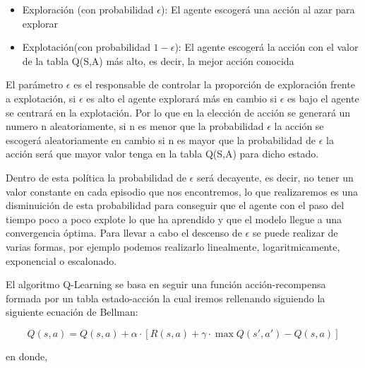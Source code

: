 \begin{itemize}
 \begin{itemize}
   \item Exploración (con probabilidad $\epsilon$): El agente escogerá una acción al azar para explorar
   \item Explotación(con probabilidad $ 1 - \epsilon$): El agente escogerá la acción con el valor de la tabla Q(S,A) más alto, es decir, la mejor acción conocida
 \end{itemize}
 
 El parámetro $\epsilon$ es el responsable de controlar la proporción de exploración frente a explotación, si $\epsilon$ es alto el agente explorará más en cambio si $\epsilon$ es bajo
 el agente se centrará en la explotación. Por lo que en la elección de acción se generará un numero n aleatoriamente, si n es menor que la probabilidad $\epsilon$ la acción se escogerá aleatoriamente
 en cambio si n es mayor que la probabilidad de $\epsilon$ la acción será que mayor valor tenga en la tabla Q(S,A) para dicho estado. \newline
 
 Dentro de esta política la probabilidad de $\epsilon$ será decayente, es decir, no tener un valor constante en cada episodio que nos encontremos, lo que realizaremos es una disminuición 
 de esta probabilidad para conseguir que el agente con el paso del tiempo poco a poco explote lo que ha aprendido y que el modelo llegue a una convergencia óptima. Para llevar a cabo el descenso
 de $\epsilon$ se puede realizar de varias formas, por ejemplo podemos realizarlo linealmente, logaritmicamente, exponencial o escalonado. \newline
  \end{itemize}

  El algoritmo Q-Learning se basa en seguir una función acción-recompensa formada por un tabla estado-acción la cual iremos rellenando siguiendo la siguiente ecuación
  de Bellman\cite{Bellman}:
  
  \begin{equation}
    Q(s, a) = Q(s, a) + \alpha \cdot [R(s, a) + \gamma \cdot \max Q(s', a') - Q(s, a)]
  \end{equation}

  en donde, 

